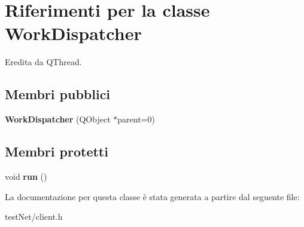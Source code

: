\hypertarget{class_work_dispatcher}{\section{Riferimenti per la classe Work\-Dispatcher}
\label{class_work_dispatcher}
}


Eredita da Q\-Thread.

\subsection*{Membri pubblici}
\begin{DoxyCompactItemize}
\item 
\hypertarget{class_work_dispatcher_a0492b5fce81f9ab824fe5da342e46a45}{{\bfseries Work\-Dispatcher} (Q\-Object $\ast$parent=0)}\label{class_work_dispatcher_a0492b5fce81f9ab824fe5da342e46a45}

\end{DoxyCompactItemize}
\subsection*{Membri protetti}
\begin{DoxyCompactItemize}
\item 
\hypertarget{class_work_dispatcher_a72eb6fdeb7acfd602977b63a72f376be}{void {\bfseries run} ()}\label{class_work_dispatcher_a72eb6fdeb7acfd602977b63a72f376be}

\end{DoxyCompactItemize}


La documentazione per questa classe è stata generata a partire dal seguente file\-:\begin{DoxyCompactItemize}
\item 
test\-Net/client.\-h\end{DoxyCompactItemize}
